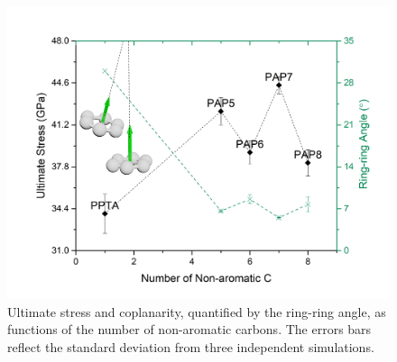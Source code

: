 \documentclass[journal=langd5,manuscript=article]{achemso}
\begin{document}


\begin{figure}[h!]
\centering
\includegraphics[scale=0.60]{Coplanarity.png}
\caption{Ultimate stress and coplanarity, quantified by the ring-ring angle, as functions of the number of non-aromatic carbons. The errors bars reflect the standard deviation from three independent simulations.}
\label{fig:Coplanarity} 
\end{figure}



\FloatBarrier
\end{document}

